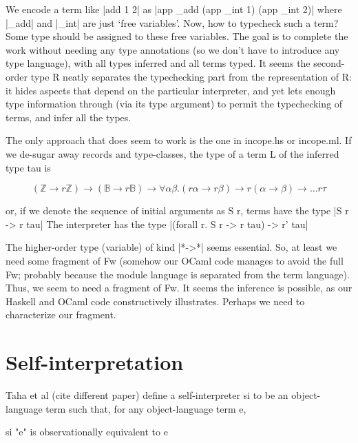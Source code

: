 \documentclass[preprint]{sigplanconf}
\let\cite=\citep
\newcommand{\ZZ}{\mathbb{Z}}
\newcommand{\BB}{\mathbb{B}}
\begin{document}
We encode a term like |add 1 2| as
|app _add (app _int 1) (app _int 2)| where |_add| and |_int| are just
`free variables'. Now, how to typecheck such a term? Some type should
be assigned to these free variables. The goal is to complete the work
without needing any type annotations (so we don't have to introduce any
type language), with all types inferred and all terms typed. It seems
the second-order type R neatly separates the typechecking part from
the representation of R: it hides aspects that depend on the
particular interpreter, and yet lets enough type information through
(via its type argument) to permit the typechecking of terms, and infer
all the types. 



The only approach that does seem to work
is the one in incope.hs or incope.ml. If we de-sugar away records and
type-classes, the type of a term L of the inferred type tau is

$$ 
  (\ZZ \rightarrow r \ZZ) \rightarrow
  (\BB \rightarrow r \BB) \rightarrow
  \forall \alpha \beta. (r \alpha \rightarrow r \beta)
      \rightarrow r (\alpha\rightarrow\beta) \rightarrow ... r \tau
$$

or, if we denote the sequence of initial arguments as S r, terms have
the type |S r -> r tau|
The interpreter has the type
|(forall r. S r -> r tau) -> r' tau|

The higher-order type (variable) of kind |*->*| seems essential. So, at
least we need some fragment of Fw (somehow our OCaml code manages to
avoid the full Fw; probably because the module language is separated
from the term language). Thus, we seem to need a fragment of Fw. It
seems the inference is possible, as our Haskell and OCaml code
constructively illustrates. Perhaps we need to characterize our
fragment.


\section{Self-interpretation}\cite{selfinterp}

Taha et al (cite different paper) define a self-interpreter si to be an
object-language term such that, for any object-language term e,

\begin{code}
  si "e"    is observationally equivalent to    e
\end{code}
\end{document}
